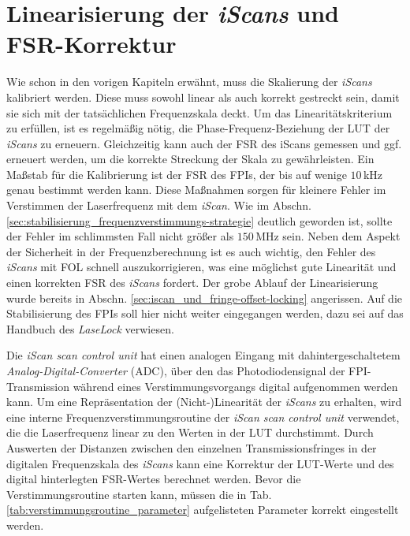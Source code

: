 \section{Linearisierung der \textit{iScans} und
FSR-Korrektur}\label{sec:linearisierung_iscan} Wie schon in den vorigen
Kapiteln erwähnt, muss die Skalierung der \textit{iScans} kalibriert werden.
Diese muss sowohl linear als auch korrekt gestreckt
sein, damit sie sich mit der tatsächlichen Frequenzskala deckt. Um das
Linearitätskriterium zu erfüllen, ist es regelmäßig nötig, die
Phase-Frequenz-Beziehung der LUT der \textit{iScans} zu erneuern. Gleichzeitig
kann auch der FSR des iScans gemessen und ggf. erneuert werden, um die korrekte
Streckung der Skala zu gewährleisten. Ein Maßstab für die Kalibrierung ist der
FSR des FPIs, der bis auf wenige $10\,$kHz genau bestimmt werden kann. Diese
Maßnahmen sorgen für kleinere Fehler im Verstimmen der Laserfrequenz mit dem \textit{iScan}. Wie im Abschn.
\ref{sec:stabilisierung_frequenzverstimmungs-strategie} deutlich geworden ist,
sollte der Fehler im schlimmsten Fall nicht größer als $150\,$MHz sein. Neben
dem Aspekt der Sicherheit in der Frequenzberechnung ist es auch wichtig, den
Fehler des \textit{iScans} mit FOL schnell auszukorrigieren, was eine möglichst
gute Linearität und einen korrekten FSR des \textit{iScans} fordert. Der grobe Ablauf
der Linearisierung wurde bereits in Abschn. \ref{sec:iscan_und_fringe-offset-locking} angerissen. Auf die Stabilisierung des FPIs soll hier nicht weiter eingegangen werden, dazu sei auf das Handbuch des \textit{LaseLock} \cite{laselock} verwiesen.\par
Die \textit{iScan scan control unit} hat einen analogen Eingang mit
dahintergeschaltetem \textit{Analog-Digital-Converter} (ADC), über den das
Photodiodensignal der FPI-Transmission während eines
Verstimmungsvorgangs digital aufgenommen werden kann. Um eine Repräsentation der
(Nicht-)Linearität der \textit{iScans} zu erhalten, wird eine interne
Frequenzverstimmungsroutine der \textit{iScan scan control unit} verwendet, die
die Laserfrequenz linear zu den Werten in der LUT durchstimmt.
Durch Auswerten der Distanzen zwischen den einzelnen
Transmissionsfringes in der digitalen Frequenzskala des \textit{iScans} kann
eine Korrektur der LUT-Werte und des digital hinterlegten FSR-Wertes berechnet
werden. Bevor die Verstimmungsroutine starten kann, müssen die in Tab.
\ref{tab:verstimmungsroutine_parameter} aufgelisteten Parameter korrekt
eingestellt werden.
